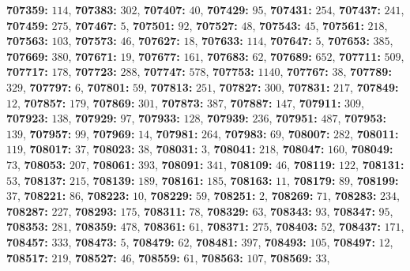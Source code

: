 \textsf{\bfseries 707359:} $114$, \textsf{\bfseries 707383:} $302$, \textsf{\bfseries 707407:} $40$, \textsf{\bfseries 707429:} $95$, \textsf{\bfseries 707431:} $254$, \textsf{\bfseries 707437:} $241$, \textsf{\bfseries 707459:} $275$, \textsf{\bfseries 707467:} $5$, \textsf{\bfseries 707501:} $92$, \textsf{\bfseries 707527:} $48$, \textsf{\bfseries 707543:} $45$, \textsf{\bfseries 707561:} $218$, \textsf{\bfseries 707563:} $103$, \textsf{\bfseries 707573:} $46$, \textsf{\bfseries 707627:} $18$, \textsf{\bfseries 707633:} $114$, \textsf{\bfseries 707647:} $5$, \textsf{\bfseries 707653:} $385$, \textsf{\bfseries 707669:} $380$, \textsf{\bfseries 707671:} $19$, \textsf{\bfseries 707677:} $161$, \textsf{\bfseries 707683:} $62$, \textsf{\bfseries 707689:} $652$, \textsf{\bfseries 707711:} $509$, \textsf{\bfseries 707717:} $178$, \textsf{\bfseries 707723:} $288$, \textsf{\bfseries 707747:} $578$, \textsf{\bfseries 707753:} $1140$, \textsf{\bfseries 707767:} $38$, \textsf{\bfseries 707789:} $329$, \textsf{\bfseries 707797:} $6$, \textsf{\bfseries 707801:} $59$, \textsf{\bfseries 707813:} $251$, \textsf{\bfseries 707827:} $300$, \textsf{\bfseries 707831:} $217$, \textsf{\bfseries 707849:} $12$, \textsf{\bfseries 707857:} $179$, \textsf{\bfseries 707869:} $301$, \textsf{\bfseries 707873:} $387$, \textsf{\bfseries 707887:} $147$, \textsf{\bfseries 707911:} $309$, \textsf{\bfseries 707923:} $138$, \textsf{\bfseries 707929:} $97$, \textsf{\bfseries 707933:} $128$, \textsf{\bfseries 707939:} $236$, \textsf{\bfseries 707951:} $487$, \textsf{\bfseries 707953:} $139$, \textsf{\bfseries 707957:} $99$, \textsf{\bfseries 707969:} $14$, \textsf{\bfseries 707981:} $264$, \textsf{\bfseries 707983:} $69$, \textsf{\bfseries 708007:} $282$, \textsf{\bfseries 708011:} $119$, \textsf{\bfseries 708017:} $37$, \textsf{\bfseries 708023:} $38$, \textsf{\bfseries 708031:} $3$, \textsf{\bfseries 708041:} $218$, \textsf{\bfseries 708047:} $160$, \textsf{\bfseries 708049:} $73$, \textsf{\bfseries 708053:} $207$, \textsf{\bfseries 708061:} $393$, \textsf{\bfseries 708091:} $341$, \textsf{\bfseries 708109:} $46$, \textsf{\bfseries 708119:} $122$, \textsf{\bfseries 708131:} $53$, \textsf{\bfseries 708137:} $215$, \textsf{\bfseries 708139:} $189$, \textsf{\bfseries 708161:} $185$, \textsf{\bfseries 708163:} $11$, \textsf{\bfseries 708179:} $89$, \textsf{\bfseries 708199:} $37$, \textsf{\bfseries 708221:} $86$, \textsf{\bfseries 708223:} $10$, \textsf{\bfseries 708229:} $59$, \textsf{\bfseries 708251:} $2$, \textsf{\bfseries 708269:} $71$, \textsf{\bfseries 708283:} $234$, \textsf{\bfseries 708287:} $227$, \textsf{\bfseries 708293:} $175$, \textsf{\bfseries 708311:} $78$, \textsf{\bfseries 708329:} $63$, \textsf{\bfseries 708343:} $93$, \textsf{\bfseries 708347:} $95$, \textsf{\bfseries 708353:} $281$, \textsf{\bfseries 708359:} $478$, \textsf{\bfseries 708361:} $61$, \textsf{\bfseries 708371:} $275$, \textsf{\bfseries 708403:} $52$, \textsf{\bfseries 708437:} $171$, \textsf{\bfseries 708457:} $333$, \textsf{\bfseries 708473:} $5$, \textsf{\bfseries 708479:} $62$, \textsf{\bfseries 708481:} $397$, \textsf{\bfseries 708493:} $105$, \textsf{\bfseries 708497:} $12$, \textsf{\bfseries 708517:} $219$, \textsf{\bfseries 708527:} $46$, \textsf{\bfseries 708559:} $61$, \textsf{\bfseries 708563:} $107$, \textsf{\bfseries 708569:} $33$, 
